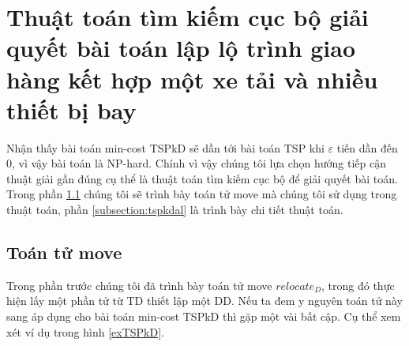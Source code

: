 \documentclass[a4paper,12pt]{report}
\begin{document}
\section{Thuật toán tìm kiếm cục bộ giải quyết bài toán lập lộ trình giao hàng kết hợp một xe tải và nhiều thiết bị bay} 
\label{section:tspkdalo}
Nhận thấy bài toán min-cost \ac{TSPkD} sẽ dần tới bài toán \ac{TSP} khi $\varepsilon$ tiến dần đến 0, vì vậy bài toán là NP-hard. Chính vì vậy chúng tôi lựa chọn hướng tiếp cận thuật giải gần đúng cụ thể là thuật toán tìm kiếm cục bộ để giải quyết bài toán. Trong phần \ref{subsection:ttmove} chúng tôi sẽ trình bày toán tử move mà chúng tôi sử dụng trong thuật toán, phần \ref{subsection:tspkdal} là trình bày chi tiết thuật toán.
\subsection{Toán tử move}
\label{subsection:ttmove}
Trong phần trước chúng tôi đã trình bày toán tử move $relocate_D$, trong đó thực hiện lấy một phần tử từ \ac{TD} thiết lập một \ac{DD}. Nếu ta đem y nguyên toán tử này sang áp dụng cho bài toán min-cost \ac{TSPkD} thì gặp một vài bất cập. Cụ thể xem xét ví dụ trong hình \ref{exTSPkD}.
\end{document}
